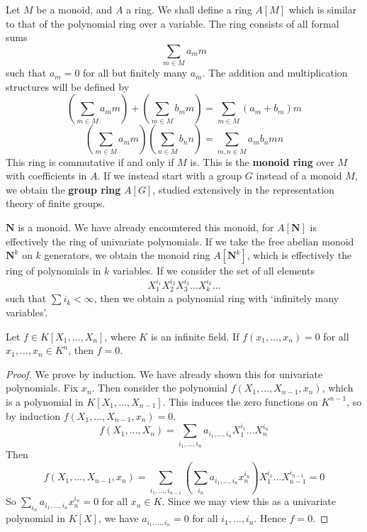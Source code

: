 Let $M$ be a monoid, and $A$ a ring. We shall define a ring $A[M]$ which is similar to that of the polynomial ring over a variable. The ring consists of all formal sums
%
\[ \sum_{m \in M} a_m m \]
%
such that $a_m = 0$ for all but finitely many $a_m$. The addition and multiplication structures will be defined by
%
\[ \left( \sum_{m \in M} a_m m \right) + \left( \sum_{m \in M} b_m m \right) = \sum_{m \in M} (a_m + b_m) m \]
%
\[ \left( \sum_{m \in M} a_m m \right) \left( \sum_{n \in M} b_n n \right) = \sum_{m,n \in M} a_m b_n m n \]
%
This ring is commutative if and only if $M$ is. This is the {\bf monoid ring} over $M$ with coefficients in $A$. If we instead start with a group $G$ instead of a monoid $M$, we obtain the {\bf group ring} $A[G]$, studied extensively in the representation theory of finite groups.

\begin{example}
    $\mathbf{N}$ is a monoid. We have already encountered this monoid, for $A[\mathbf{N}]$ is effectively the ring of univariate polynomials. If we take the free abelian monoid $\mathbf{N}^k$ on $k$ generators, we obtain the monoid ring $A[\mathbf{N}^k]$, which is effectively the ring of polynomials in $k$ variables. If we consider the set of all elements
    \[ X_1^{i_1} X_2^{i_2} X_3^{i_2} \dots X_k^{i_k} \dots \]
    such that $\sum i_k < \infty$, then we obtain a polynomial ring with `infinitely many variables'.
\end{example}

\begin{corollary}
    Let $f \in K[X_1, \dots, X_n]$, where $K$ is an infinite field. If $f(x_1, \dots, x_n) = 0$ for all $x_1, \dots, x_n \in K^n$, then $f = 0$.
\end{corollary}
\begin{proof}
    We prove by induction. We have already shown this for univariate polynomials. Fix $x_n$. Then consider the polynomial $f(X_1, \dots, X_{n-1}, x_n)$, which is a polynomial in $K[X_1, \dots, X_{n-1}]$. This induces the zero functions on $K^{n-1}$, so by induction $f(X_1, \dots, X_{n-1}, x_n) = 0$.
    \[ f(X_1, \dots, X_n) = \sum_{i_1, \dots, i_n} a_{i_1, \dots, i_n} X_1^{i_1} \dots X_n^{i_n} \]
    Then
    \[ f(X_1, \dots, X_{n-1}, x_n) = \sum_{i_1, \dots, i_{n-1}} \left(\sum_{i_n} a_{i_1, \dots, i_n} x_n^{i_n} \right) X_1^{i_1} \dots X_{n-1}^{i_{n-1}} = 0 \]
    So $\sum_{i_n} a_{i_1, \dots, i_n} x_n^{i_n} = 0$ for all $x_n \in K$. Since we may view this as a univariate polynomial in $K[X]$, we have $a_{i_1, \dots, i_n} = 0$ for all $i_1, \dots, i_n$. Hence $f = 0$.
\end{proof}

